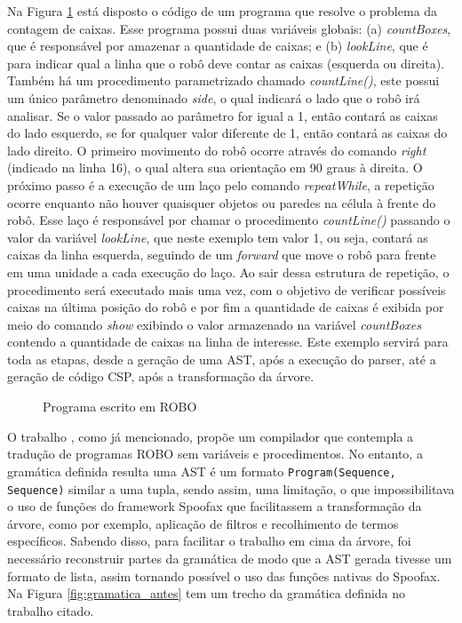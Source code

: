 Na Figura \ref{fig:roboprogram} está disposto o código de um programa que resolve o problema da contagem de caixas. Esse programa possui duas variáveis globais: (a) \textit{countBoxes}, que é responsável por amazenar a quantidade de caixas; e (b) \textit{lookLine}, que é para indicar qual a linha que o robô deve contar as caixas (esquerda ou direita). Também há um procedimento parametrizado chamado \textit{countLine()}, este possui um único parâmetro denominado \textit{side}, o qual indicará o lado que o robô irá analisar. Se o valor passado ao parâmetro for igual a 1, então contará as caixas do lado esquerdo, se for qualquer valor diferente de 1, então contará as caixas do lado direito. O primeiro movimento do robô ocorre através do comando \textit{right} (indicado na linha 16), o qual altera sua orientação em 90 graus à direita. O próximo passo é a execução de um laço pelo comando \textit{repeatWhile}, a repetição ocorre enquanto não houver quaisquer objetos ou paredes na célula à frente do robô. Esse laço é responsável por chamar o procedimento \textit{countLine()} passando o valor da variável \textit{lookLine}, que neste exemplo tem valor 1, ou seja, contará as caixas da linha esquerda, seguindo de um \textit{forward} que move o robô para frente em uma unidade a cada execução do laço. Ao sair dessa estrutura de repetição, o procedimento será executado mais uma vez, com o objetivo de verificar possíveis caixas na última posição do robô e por fim a quantidade de caixas é exibida por meio do comando \textit{show} exibindo o valor armazenado na variável \textit{countBoxes} contendo a quantidade de caixas na linha de interesse. Este exemplo servirá para toda as etapas, desde a geração de uma AST, após a execução do parser, até a geração de código CSP, após a transformação da árvore.

\begin{figure}[h]
\caption{Programa escrito em ROBO}

\label{fig:roboprogram}
\end{figure}

O trabalho \cite{nogueira}, como já mencionado, propõe um compilador que contempla a tradução de programas ROBO sem variáveis e procedimentos. No entanto, a gramática definida resulta uma AST é um formato  \texttt{Program(Sequence, Sequence)} similar a uma tupla, sendo assim, uma limitação, o que impossibilitava o uso de funções do framework Spoofax que facilitassem a transformação da árvore, como por exemplo, aplicação de filtros e recolhimento de termos específicos. Sabendo disso, para facilitar o trabalho em cima da árvore, foi necessário reconstruir partes da gramática de modo que a AST gerada tivesse um formato de lista, assim tornando possível o uso das funções nativas do Spoofax. Na Figura \ref{fig:gramatica_antes} tem um trecho da gramática definida no trabalho citado.


